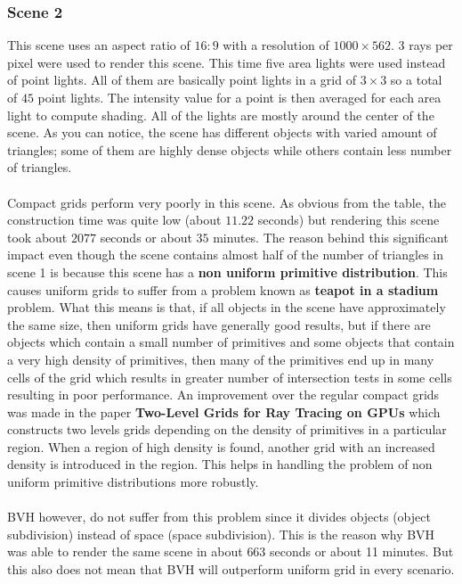 \documentclass[11pt,a4paper]{article}
\begin{document}
\subsubsection{Scene 2}
This scene uses an aspect ratio of $16:9$ with a resolution of $1000 \times 562$. 3 rays per pixel were used to render this scene. This time five area lights were used instead of point lights. All of them are basically point lights in a grid of $3 \times 3$ so a total of $45$ point lights. The intensity value for a point is then averaged for each area light to compute shading. All of the lights are mostly around the center of the scene. As you can notice, the scene has different objects with varied amount of triangles; some of them are highly dense objects while others contain less number of triangles.
\\~\\
Compact grids perform very poorly in this scene. As obvious from the table, the construction time was quite low (about $11.22$ seconds) but rendering this scene took about $2077$ seconds or about $35$ minutes. The reason behind this significant impact even though the scene contains almost half of the number of triangles in scene 1 is because this scene has a \textbf{non uniform primitive distribution}. This causes uniform grids to suffer from a problem known as \textbf{teapot in a stadium} \cite{utahteapot} problem. What this means is that, if all objects in the scene have approximately the same size, then uniform grids have generally good results, but if there are objects which contain a small number of primitives and some objects that contain a very high density of primitives, then many of the primitives end up in many cells of the grid which results in greater number of intersection tests in some cells resulting in poor performance. An improvement over the regular compact grids was made in the paper \textbf{Two-Level Grids for Ray Tracing on GPUs} \cite{kalojanov2011two} which constructs two levels grids depending on the density of primitives in a particular region. When a region of high density is found, another grid with an increased density is introduced in the region. This helps in handling the problem of non uniform primitive distributions more robustly.
\\~\\
BVH however, do not suffer from this problem since it divides objects (object subdivision) instead of space (space subdivision). This is the reason why BVH was able to render the same scene in about $663$ seconds or about 11 minutes. But this also does not mean that BVH will outperform uniform grid in every scenario. 
\end{document}
